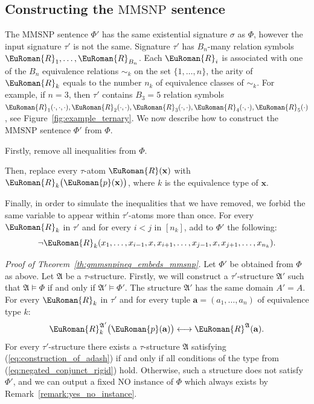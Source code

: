 \documentclass[10pt,a4paper]{amsart}
\theoremstyle{plain}
\theoremstyle{definition}
\numberwithin{equation}{section}
\renewcommand{\proof}[1][Proof]{\par\noindent\textit{#1.}\enspace\ignorespaces}
\newcommand{\eurm}[1]{\EuRoman{#1}} %
\newcommand{\structure}[1]{\mathfrak{#1}} %
\newcommand{\tuple}[1]{\mathbf{#1}} %
\newcommand{\rel}[1]{\eurm{#1}} %
\newcommand{\func}[1]{\eurm{#1}}  %
\newcommand{\MMSNP}[0]{\textrm{MMSNP}}
\begin{document}
\subsection*{Constructing the $\MMSNP$ sentence} 
The $\MMSNP$ sentence $\Phi'$ has the same existential signature $\sigma$ as $\Phi$, however the input signature $\tau'$ is not the same.
Signature $\tau'$ has $B_n$-many relation symbols $\rel{R}_1,\ldots,\rel{R}_{B_n}$.
Each $\rel{R}_i$ is associated with one of the $B_n$ equivalence relations $\sim_k$ on the set $\{1,\ldots,n\}$, the arity of $\rel{R}_k$ equals to the number $n_k$ of equivalence classes of $\sim_k$. For example, if $n=3$, then $\tau'$ contains $B_3=5$ relation symbols $\rel{R}_1(\cdot,\cdot,\cdot), \rel{R}_2(\cdot,\cdot), \rel{R}_3(\cdot,\cdot), \rel{R}_4(\cdot,\cdot), \rel{R}_5(\cdot)$, see Figure~\ref{fig:example_ternary}.
We now describe how to construct the $\MMSNP$ sentence $\Phi'$ from $\Phi$.
\begin{compactitem} 
\item Firstly, remove all inequalities from $\Phi$. 
\item Then, replace every $\tau$-atom $\rel{R}(\tuple{x})$ with $\rel{R}_k\bigl(\func{p}(\tuple{x})\bigr)$, where $k$ is the equivalence type of $\tuple{x}$.
\item Finally, in order to simulate the inequalities that we have removed, we forbid the same variable to appear within $\tau'$-atoms more than once. For every $\rel{R}_k$ in $\tau'$ and for every $i<j$ in $[n_k]$, add to $\Phi'$ the following: 
\begin{equation}\label{eq:negated_conjunct_rigid} 
\neg\rel{R}_k(x_1,\ldots,x_{i-1},x,x_{i+1},\ldots,x_{j-1},x,x_{j+1},\ldots,x_{n_k}). 
\end{equation}
\end{compactitem}
\proof[Proof of Theorem~\ref{th:gmmsnpineq_embeds_mmsnp}] 
Let $\Phi'$ be obtained from $\Phi$ as above.
Let $\structure{A}$ be a $\tau$-structure.
Firstly, we will construct a $\tau'$-structure $\structure{A}'$ such that $\structure{A}\models\Phi$ if and only if $\structure{A}'\models\Phi'$.
The structure $\structure{A}'$ has the same domain $A'=A$.
For every $\rel{R}_k$ in $\tau'$ and for every tuple $\tuple{a} = (a_1,\ldots,a_n)$ of equivalence type $k$:
\begin{equation}\label{eq:construction_of_adash}
\rel{R}_k^{\structure{A}'}\bigl(\func{p}(\tuple{a})\bigr) \longleftrightarrow \rel{R}^\structure{A}(\tuple{a}).
\end{equation}
For every $\tau'$-structure there exists a $\tau$-structure $\structure{A}$ satisfying (\ref{eq:construction_of_adash}) if and only if all conditions of the type from (\ref{eq:negated_conjunct_rigid}) hold.
Otherwise, such a structure does not satisfy $\Phi'$, and we can output a fixed NO instance of $\Phi$ which always exists by Remark~\ref{remark:yes_no_instance}.
\end{document}
